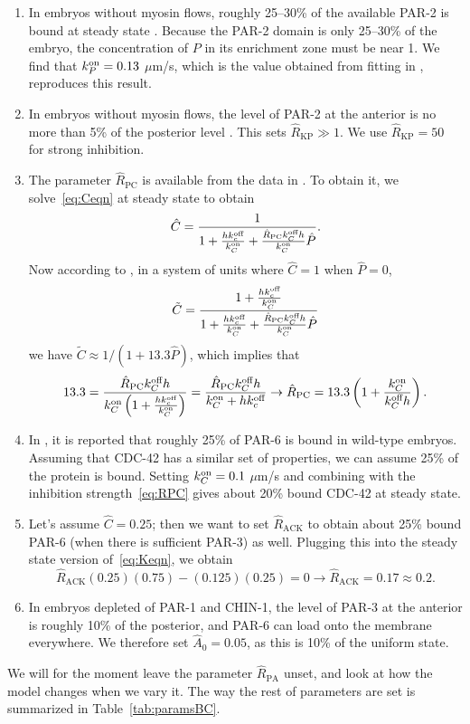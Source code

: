 \documentclass[11pt]{article}
\newcommand{\6}[1]{#1_{\text{6}}}
\newcommand{\3}[1]{#1_{\text{3}}}
\begin{document}
\begin{enumerate}
\item In embryos without myosin flows, roughly 25--30\% of the available PAR-2 is bound at steady state \cite[Fig.~S3]{gross2019guiding}. Because the PAR-2 domain is only 25--30\% of the embryo, the concentration of $P$ in its enrichment zone must be near 1. We find that $k^\text{on}_P=0.13$ $\mu$m/s, which is the value obtained from fitting in \cite{gross2019guiding}, reproduces this result.
\item In embryos without myosin flows, the level of PAR-2 at the anterior is no more than 5\% of the posterior level \cite[Fig.~2c]{gross2019guiding}. This sets $\hat R_\text{KP} \gg 1$. We use $\hat R_\text{KP}=50$ for strong inhibition. 
\item The parameter $\hat{R}_\text{PC}$ is available from the data in \cite{sailer2015dynamic}. To obtain it, we solve\ \eqref{eq:Ceqn} at steady state to obtain
\begin{equation}
\hat C = \frac{1}{1+\frac{h k^\text{off}_c}{k^\text{on}_C}+\frac{\hat R_\text{PC}k^\text{off}_C h}{k^\text{on}_C} \hat P}. 
\end{equation}
Now according to \cite{sailer2015dynamic}, in a system of units where $\hat C=1$ when $\hat P=0$,
\begin{equation*}
\tilde C =   \frac{1+\frac{h k^\text{off}_c}{k^\text{on}_C}}{1+\frac{h k^\text{off}_c}{k^\text{on}_C}+\frac{\hat R_\text{PC}k^\text{off}_C h}{k^\text{on}_C} \hat P}
\end{equation*} 
we have $\tilde{C} \approx 1/(1+13.3\hat{P})$, which implies that 
\begin{equation}
\label{eq:RPC}
13.3 = \frac{\hat R_\text{PC}k^\text{off}_C h}{k^\text{on}_C\left(1+\frac{h k^\text{off}_c}{k^\text{on}_C}\right)}= \frac{\hat R_\text{PC}k^\text{off}_C h}{k^\text{on}_C+h k^\text{off}_c} \rightarrow \hat R_\text{PC}=13.3\left(1+\frac{k^\text{on}_C}{k^\text{off}_C h}\right).
\end{equation}
\item In \cite[Fig.~S3i]{gross2019guiding}, it is reported that roughly 25\% of PAR-6 is bound in wild-type embryos. Assuming that CDC-42 has a similar set of properties, we can assume 25\% of the protein is bound. Setting $k^\text{on}_C=0.1$ $\mu$m/s and combining with the inhibition strength\ \eqref{eq:RPC} gives about 20\% bound CDC-42 at steady state.
\item Let's assume $\hat C = 0.25$; then we want to set $\hat{R}_\text{ACK}$ to obtain about 25\% bound PAR-6 (when there is sufficient PAR-3) as well. Plugging this into the steady state version of\ \eqref{eq:Keqn}, we obtain
\begin{equation*}
\hat{R}_\text{ACK}(0.25)(0.75)- (0.125)(0.25)=0 \rightarrow \hat{R}_\text{ACK}=0.17\approx 0.2.
\end{equation*}
\item In embryos depleted of PAR-1 and CHIN-1, the level of PAR-3 at the anterior is roughly 10\% of the posterior, and PAR-6 can load onto the membrane everywhere. We therefore set $\hat A_0=0.05$, as this is 10\% of the uniform state.
\end{enumerate}
We will for the moment leave the parameter $\hat R_\text{PA}$ unset, and look at how the model changes when we vary it. The way the rest of parameters are set is summarized in Table\ \ref{tab:paramsBC}.
\end{document}
